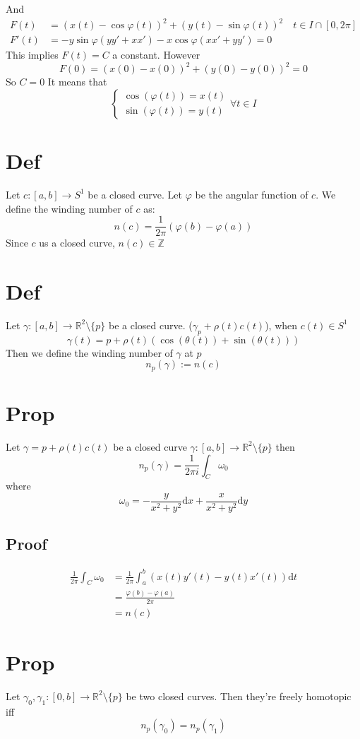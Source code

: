 \documentclass{book}
\begin{document}
And 
$$\begin{aligned}
    F(t) &=(x(t)-\cos\varphi(t))^2+(y(t)-\sin \varphi(t))^2\quad t\in I\cap[0,2\pi]\\
    F'(t)&=-y\sin\varphi(yy'+xx')-x\cos\varphi(xx'+yy')=0
\end{aligned}$$
This implies $F(t)=C$ a constant. However
$$F(0)=(x(0)-x(0))^2+(y(0)-y(0))^2=0$$
So $C=0$ It means that 
$$\begin{cases}
    \cos(\varphi(t))=x(t)\\
    \sin (\varphi(t))=y(t)
\end{cases}\forall t\in I$$
\section{Def}
Let $c:[a,b]\rightarrow S^1$ be a closed curve. Let $\varphi$ be the angular function of $c$. We define the winding number of $c$ as:
$$n(c)=\frac{1}{2\pi}(\varphi(b)-\varphi(a))$$
Since $c$ us a closed curve, $n(c)\in \mathbb{Z}$
\section{Def}
Let $\gamma:[a,b]\rightarrow\mathbb{R}^2\setminus\{p\}$ be a closed curve. ($\gamma_p+\rho(t)c(t)$), when $c(t)\in S^1$$$\gamma(t)=p+\rho(t)(\cos(\theta(t))+\sin(\theta(t)))$$
Then we define the winding number of $\gamma$ at $p$
$$n_p(\gamma):=n(c)$$
\section{Prop}
Let $\gamma=p+\rho(t)c(t)$ be a closed curve $\gamma:[a,b]\rightarrow \mathbb{R}^2\setminus\{p\}$ then
$$n_p(\gamma)=\frac{1}{2\pi i}\int_C\omega_0$$
where $$\omega_0=-\frac{y}{x^2+y^2}\text{d} x+\frac{x}{x^2+y^2}\text{d}y$$
\subsection*{Proof}
$$\begin{aligned}
    \frac{1}{2\pi}\int_C\omega_0 &=\frac{1}{2\pi}\int_a^b(x(t)y'(t)-y(t)x'(t))\text{d}t\\
    &=\frac{\varphi(b)-\varphi(a)}{2\pi}\\
    &=n(c)
\end{aligned}$$
\section{Prop}
Let $\gamma_0,\gamma_1:[0,b]\rightarrow\mathbb{R}^2\setminus\{p\}$ be two closed curves. Then they're freely homotopic iff$$n_p(\gamma_0)=n_p(\gamma_1)$$
\end{document}
